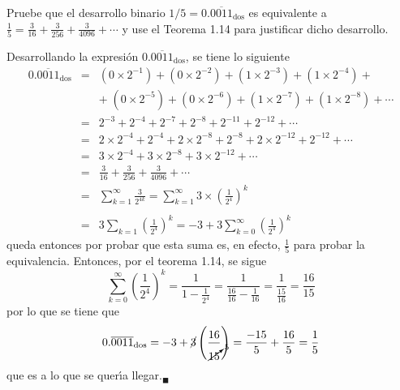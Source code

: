 \begin{enunciado}
 Pruebe que el desarrollo binario $1/5 = 0.\overline{0011}_{\text{dos}}$ es equivalente a $\frac{1}{5} = \frac{3}{16} + \frac{3}{256} + \frac{3}{4096} + \cdots$ y use el Teorema 1.14 para justificar dicho desarrollo.
\end{enunciado}

\begin{solucion}
 Desarrollando la expresi\'on $0.\overline{0011}_{\text{dos}}$, se tiene lo siguiente
 \begin{eqnarray*}
  0.\overline{0011}_{\text{dos}} & = & \left( 0 \times 2^{-1} \right) + \left( 0 \times 2^{-2} \right) + \left( 1 \times 2^{-3} \right) + \left( 1 \times 2^{-4} \right) + \\
  & & + \; \left( 0 \times 2^{-5} \right) + \left( 0 \times 2^{-6} \right) + \left( 1 \times 2^{-7} \right) + \left( 1 \times 2^{-8} \right) + \cdots \\ 
  & = & 2^{-3} + 2^{-4} + 2^{-7} + 2^{-8} + 2^{-11} + 2^{-12} + \cdots \\ 
  & = & 2\times 2^{-4} + 2^{-4} + 2\times 2^{-8} + 2^{-8} + 2\times 2^{-12} + 2^{-12} + \cdots \\
  & = & 3\times 2^{-4} + 3\times 2^{-8} + 3\times 2^{-12} + \cdots \\
  & = & \frac{3}{16} + \frac{3}{256} + \frac{3}{4096} + \cdots \\
  & = & \displaystyle{ \sum_{k=1}^{\infty} \frac{3}{2^{4k}} = \sum_{k=1}^{\infty} 3\times \left( \frac{1}{2^{4}} \right)^k } \\
  \\
  & = & \displaystyle{ 3\sum_{k=1} \left( \frac{1}{2^{4}} \right)^k = -3 + 3 \sum_{k=0}^{\infty} \left( \frac{1}{2^4} \right)^k }
 \end{eqnarray*}
 queda entonces por probar que esta suma es, en efecto, $\frac{1}{5}$ para probar la equivalencia. Entonces, por el teorema 1.14, se sigue
 \begin{equation*}
  \sum_{k=0}^{\infty} \left( \frac{1}{2^4} \right)^k = \frac{1}{1-\frac{1}{2^4}} = \frac{1}{\frac{16}{16} - \frac{1}{16}} = \frac{1}{\frac{15}{16}} = \frac{16}{15}
 \end{equation*}
 por lo que se tiene que 
 \begin{equation*}
  0.\overline{0011}_{\text{dos}} = -3 + \cancel{3}\left( \frac{16}{\cancelto{5}{15}} \right)  = \frac{-15}{5} + \frac{16}{5} = \frac{1}{5}
 \end{equation*}
 que es a lo que se quer\'{\i}a llegar.${}_{\blacksquare}$
\end{solucion}
